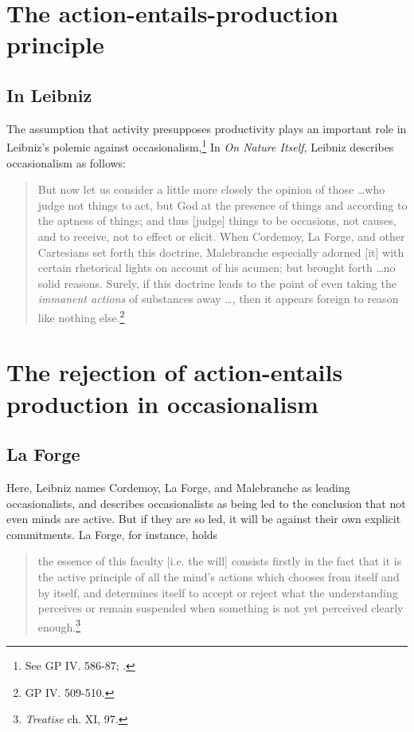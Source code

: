 \section{The action-entails-production principle}
\subsection{In Leibniz}
The assumption that activity presupposes productivity plays an important role in Leibniz's polemic against occasionalism,\footnote{See GP IV. 586-87; \autocite{Rutherford1993}.} In \emph{On Nature Itself}, Leibniz describes occasionalism as follows:

\begin{quote}
	But now let us consider a little more closely the opinion of those \ldots who judge not things to act, but God at the presence of things and according to the aptness of things; and thus [judge] things to be occasions, not causes, and to receive, not to effect or elicit. When Cordemoy, La Forge, and other Cartesians set forth this doctrine, Malebranche especially adorned [it] with certain rhetorical lights on account of his acumen; but brought forth \ldots no solid reasons. Surely, if this doctrine leads to the point of even taking the \emph{immanent actions} of substances away \ldots, then it appears foreign to reason like nothing else.\footnote{GP IV. 509-510.}
\end{quote}
\section{The rejection of action-entails production in occasionalism}
\subsection{La Forge}
Here, Leibniz names Cordemoy, La Forge, and Malebranche as leading occasionalists, and describes occasionalists as being led to the conclusion that not even minds are active. But if they are so led, it will be against their own explicit commitments. La Forge, for instance, holds

\begin{quote}
	the essence of this faculty [i.e. the will] consists firstly in the fact that it is the active principle of all the mind's actions which chooses from itself and by itself, and determines itself to accept or reject what the understanding perceives or remain suspended when something is not yet perceived clearly enough.\footnote{\emph{Treatise} ch. XI, 97.}
\end{quote}

